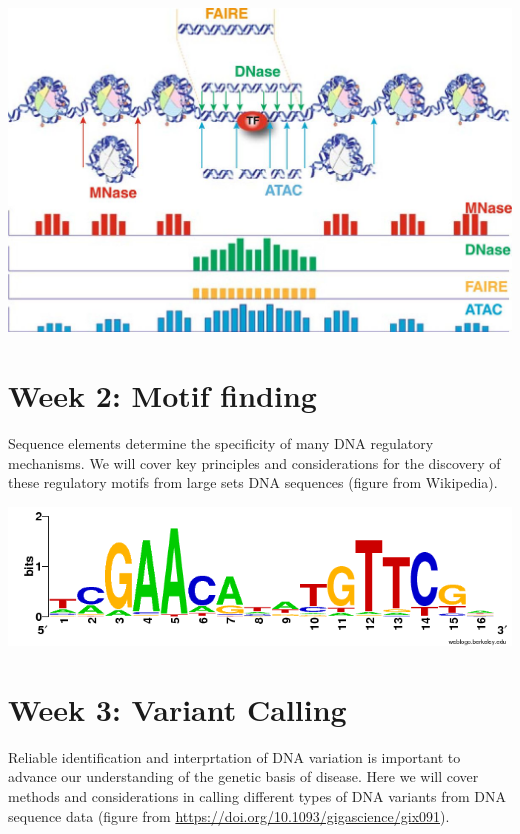 \documentclass[]{book}
\begin{document}
\begin{center}\includegraphics[width=16.67in]{classes/images/chromatin_accesibility} \end{center}

\hypertarget{week-2-motif-finding}{%
\section{Week 2: Motif finding}\label{week-2-motif-finding}}

Sequence elements determine the specificity of many DNA regulatory mechanisms. We will cover key principles and considerations for the discovery of these regulatory motifs from large sets DNA sequences (figure from Wikipedia).

\begin{center}\includegraphics[width=9.44in]{classes/images/sequence_logo} \end{center}

\hypertarget{week-3-variant-calling}{%
\section{Week 3: Variant Calling}\label{week-3-variant-calling}}

Reliable identification and interprtation of DNA variation is important to advance our understanding of the genetic basis of disease. Here we will cover methods and considerations in calling different types of DNA variants from DNA sequence data (figure from \url{https://doi.org/10.1093/gigascience/gix091}).
\end{document}
